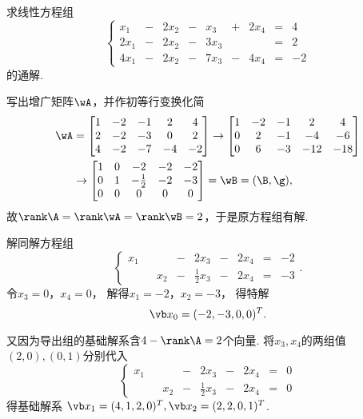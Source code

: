\begin{example}
求线性方程组\[
	\left\{ \begin{array}{*{9}{r}}
		x_1 &-& 2 x_2 &-& x_3 &+& 2 x_4 &=& 4 \\
		2 x_1 &-& 2 x_2 &-& 3 x_3 && &=& 2 \\
		4 x_1 &-& 2 x_2 &-& 7 x_3 &-& 4 x_4 &=& -2
	\end{array} \right.
\]的通解.
\begin{solution}
写出增广矩阵\(\wA\)，并作初等行变换化简
\begin{align*}
	\wA
	&= \begin{bmatrix}
		1 & -2 & -1 & 2 & 4 \\
		2 & -2 & -3 & 0 & 2 \\
		4 & -2 & -7 & -4 & -2
	\end{bmatrix}
	\to \begin{bmatrix}
		1 & -2 & -1 & 2 & 4 \\
		0 & 2 & -1 & -4 & -6 \\
		0 & 6 & -3 & -12 & -18
	\end{bmatrix} \\
	&\to \begin{bmatrix}
		1 & 0 & -2 & -2 & -2 \\
		0 & 1 & -\tfrac12 & -2 & -3 \\
		0 & 0 & 0 & 0 & 0
	\end{bmatrix}
	= \wB
	= (\B,\g),
\end{align*}
故\(\rank\A = \rank\wA = \rank\wB = 2\)，于是原方程组有解.

解同解方程组\[
	\left\{ \begin{array}{*{9}{c}}
		x_1 && &-& 2 x_3 &-& 2 x_4 &=& -2 \\
		&& x_2 &-& \frac12 x_3 &-& 2 x_4 &=& -3
	\end{array} \right..
\]
令\(x_3 = 0\)，\(x_4 = 0\)，
解得\(x_1 = -2\)，\(x_2 = -3\)，
得特解\[
	\x_0 = (-2,-3,0,0)^T.
\]

又因为导出组的基础解系含\(4 - \rank\A = 2\)个向量.
将\(x_3,x_4\)的两组值\((2,0),(0,1)\)分别代入\[
	\left\{ \begin{array}{*{9}{c}}
		x_1 && &-& 2 x_3 &-& 2 x_4 &=& 0 \\
		&& x_2 &-& \frac12 x_3 &-& 2 x_4 &=& 0
	\end{array} \right.
\]
得基础解系
\(\x_1 = (4,1,2,0)^T,
\x_2 = (2,2,0,1)^T\).


\end{solution}
\end{example}
